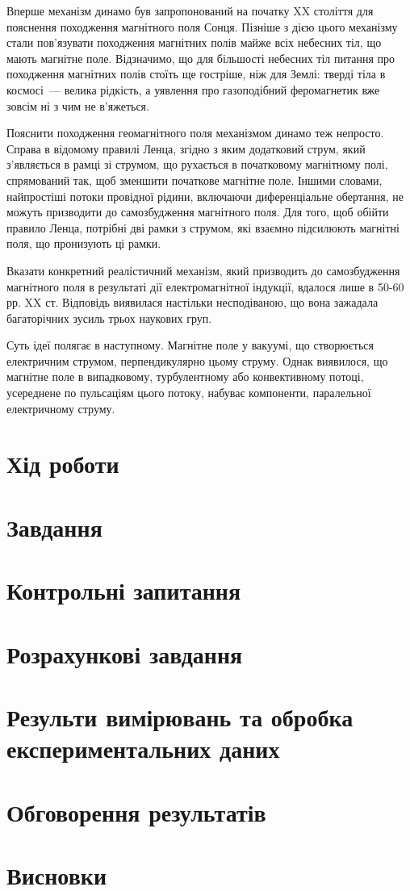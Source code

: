 \documentclass{LabWork}
\begin{document}
Вперше механізм динамо був запропонований на початку XX століття для пояснення походження магнітного поля Сонця. Пізніше з дією цього механізму стали пов'язувати походження магнітних полів майже всіх небесних тіл, що мають магнітне поле. Відзначимо, що для більшості небесних тіл питання про походження магнітних полів стоїть ще гостріше, ніж для Землі: тверді тіла в космосі~--- велика рідкість, а уявлення про газоподібний феромагнетик вже зовсім ні з чим не в'яжеться.

Пояснити походження геомагнітного поля механізмом динамо теж непросто. Справа в відомому правилі Ленца, згідно з яким додатковий струм, який з'являється в рамці зі струмом, що рухається в початковому магнітному полі, спрямований так, щоб зменшити початкове магнітне поле. Іншими словами, найпростіші потоки провідної рідини, включаючи диференціальне обертання, не можуть призводити до самозбудження магнітного поля. Для того, щоб обійти правило Ленца, потрібні дві рамки з струмом, які взаємно підсилюють магнітні поля, що пронизують ці рамки.

Вказати конкретний реалістичний механізм, який призводить до самозбудження магнітного поля в результаті дії електромагнітної індукції, вдалося лише в 50-60 рр. XX ст. Відповідь виявилася настільки несподіваною, що вона зажадала багаторічних зусиль трьох наукових груп.

Суть ідеї полягає в наступному. Магнітне поле у вакуумі, що створюється електричним струмом, перпендикулярно цьому струму. Однак виявилося, що магнітне поле в випадковому, турбулентному або конвективному потоці, усереднене по пульсаціям цього потоку, набуває компоненти, паралельної електричному струму.

\section{Хід роботи}



\section{Завдання}


\section{Контрольні запитання}



\section{Розрахункові завдання}




\section{Результи вимірювань та обробка експериментальних даних}


\section{Обговорення результатів}


\section*{Висновки}
\end{document}
